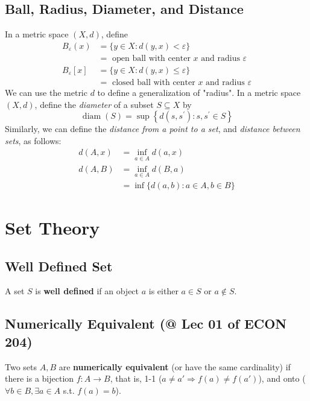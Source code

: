\documentclass[11pt]{elegantbook}
\begin{document}
\subsection{Ball, Radius, Diameter, and Distance}
In a metric space $(X, d)$, define
$$
\begin{aligned}
B_{\varepsilon}(x) & =\{y \in X: d(y, x)<\varepsilon\} \\
& =\text { open ball with center } x \text { and radius } \varepsilon \\
B_{\varepsilon}[x] & =\{y \in X: d(y, x) \leq \varepsilon\} \\
& =\text { closed ball with center } x \text { and radius } \varepsilon
\end{aligned}
$$
We can use the metric $d$ to define a generalization of "radius". In a metric space $(X, d)$, define the \textit{diameter} of a subset $S \subseteq X$ by
$$
\operatorname{diam}(S)=\sup \left\{d\left(s, s^{\prime}\right): s, s^{\prime} \in S\right\}
$$
Similarly, we can define the \textit{distance from a point to a set}, and \textit{distance between sets}, as follows:
$$
\begin{aligned}
d(A, x) & =\inf _{a \in A} d(a, x) \\
d(A, B) & =\inf _{a \in A} d(B, a) \\
& =\inf \{d(a, b): a \in A, b \in B\}
\end{aligned}
$$

\section{Set Theory}
\subsection{Well Defined Set}
\begin{definition}
    A set $S$ is \textbf{well defined} if an object $a$ is either $a\in S$ or $a\notin S$.
\end{definition}

\subsection{Numerically Equivalent \small{(@ Lec 01 of ECON 204)}}
\begin{definition}
\normalfont
    Two sets $A, B$ are \textbf{numerically equivalent} (or have the same cardinality) if there is a bijection $f : A \rightarrow B$, that is, 1-1 ($a \neq a' \Rightarrow f(a) \neq f(a')$), and onto ($\forall b\in B, \exists a\in A$ s.t. $f(a)=b$).
\end{definition}
\end{document}
